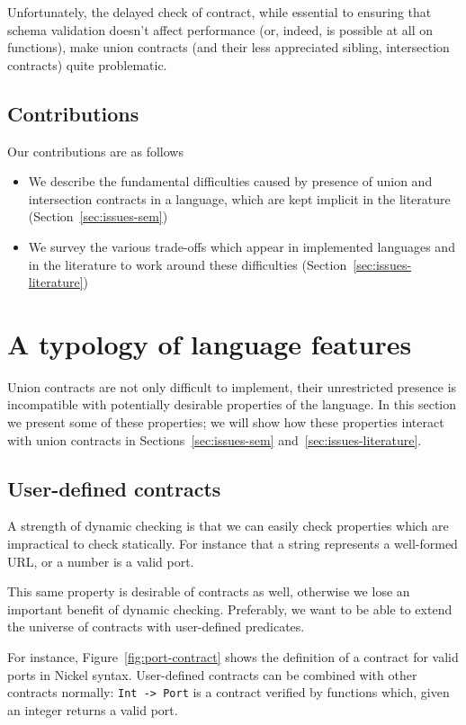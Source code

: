 \documentclass[sigplan,10pt]{acmart}
\newcommand{\nickel}[1]{\lstinline[language=nickel]{#1}}
\begin{document}
Unfortunately, the delayed check of contract, while essential to
ensuring that schema validation doesn't affect performance (or, indeed,
is possible at all on functions), make union contracts (and their less
appreciated sibling, intersection contracts) quite problematic.

\subsection{Contributions}
Our contributions are as follows
\begin{itemize}
\item We describe the fundamental difficulties caused by presence of
  union and intersection contracts in a language, which are kept
  implicit in the literature (Section~\ref{sec:issues-sem})
\item We survey the various trade-offs which appear in implemented
  languages and in the literature to work around these difficulties
  (Section~\ref{sec:issues-literature})
\end{itemize}

\section{A typology of language features}
\label{sec:feat-lang}

Union contracts are not only difficult to implement, their
unrestricted presence is incompatible with potentially desirable
properties of the language. In this section we present some of these
properties; we will show how these properties interact with union
contracts in Sections~\ref{sec:issues-sem}
and~\ref{sec:issues-literature}.

\subsection{User-defined contracts}
\label{sec:flat-contracts}

A strength of dynamic checking is that we can easily check properties which
are impractical to check statically. For instance that a string
represents a well-formed URL, or a number is a valid port.

This same property is desirable of contracts as well, otherwise we
lose an important benefit of dynamic checking. Preferably, we want to
be able to extend the universe of contracts with user-defined
predicates.

For instance, Figure~\ref{fig:port-contract} shows the definition of a
contract for valid ports in Nickel syntax.
%
User-defined contracts can be combined with other contracts normally:
\nickel{Int -> Port} is a contract verified by functions
which, given an integer returns a valid port.
\end{document}
